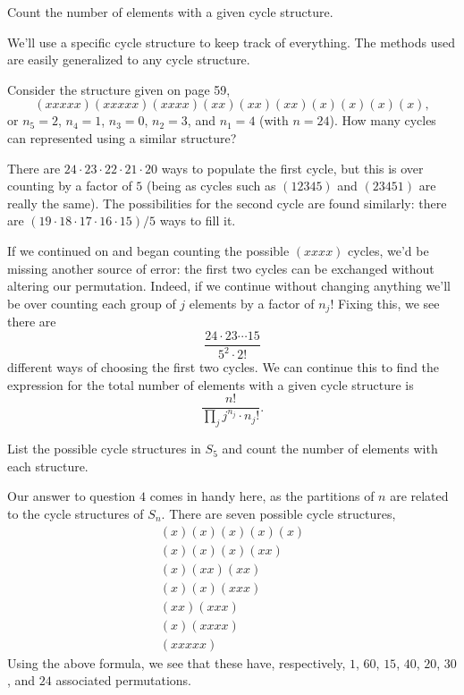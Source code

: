 \documentclass[../group-theory-in-a-nutshell-for-physicists.tex]{subfiles}
\begin{document}
\begin{questions}
\question Count the number of elements with a given cycle structure.

\begin{solution}
We'll use a specific cycle structure to keep track of everything.
The methods used are easily generalized to any cycle structure.

Consider the structure given on page 59,
\[
(xxxxx)(xxxxx)(xxxx)(xx)(xx)(xx)(x)(x)(x)(x),
\]
or $n_{5} = 2$, $n_{4} = 1$, $n_{3} = 0$, $n_{2} = 3$, and
$n_{1} = 4$ (with $n = 24$). How many cycles can represented using a
similar structure?

There are $24 \cdot 23 \cdot 22 \cdot 21 \cdot 20$ ways to populate
the first cycle, but this is over counting by a factor of $5$ (being
as cycles such as $(12345)$ and $(23451)$ are really the same). The
possibilities for the second cycle are found similarly: there are
$(19 \cdot 18 \cdot 17 \cdot 16 \cdot 15)/5$ ways to fill it.

If we continued on and began counting the possible $(xxxx)$ cycles, we'd be missing another source of error: the first two cycles can be exchanged without altering our permutation. Indeed, if we continue without changing
anything we'll be over counting each group of $j$ elements by a factor
of $n_{j}!$ Fixing this, we see there are
\[
\frac{24 \cdot 23\cdots 15}{5^{2} \cdot 2!}
\]
different ways of choosing the first two cycles. We can continue this to
find the expression for the total number of elements with a given cycle
structure is
\[
\frac{n!}{\prod_{j}j^{n_{j}} \cdot n_{j}!}.
\]
\end{solution}

\question List the possible cycle structures in $S_{5}$ and count the number of elements with each structure.

\begin{solution}
Our answer to question $4$ comes in handy here, as the partitions of
$n$ are related to the cycle structures of $S_{n}$. There are seven
possible cycle structures,
\begin{gather*}
(x)(x)(x)(x)(x) \\
(x)(x)(x)(xx) \\
(x)(xx)(xx) \\
(x)(x)(xxx) \\
(xx)(xxx) \\
(x)(xxxx) \\
(xxxxx)
\end{gather*}
Using the above formula, we see that these have, respectively, \(1\),
\(60\), \(15\), \(40\), \(20\), \(30\), and \(24\) associated
permutations.
\end{solution}


\end{questions}
\end{document}
